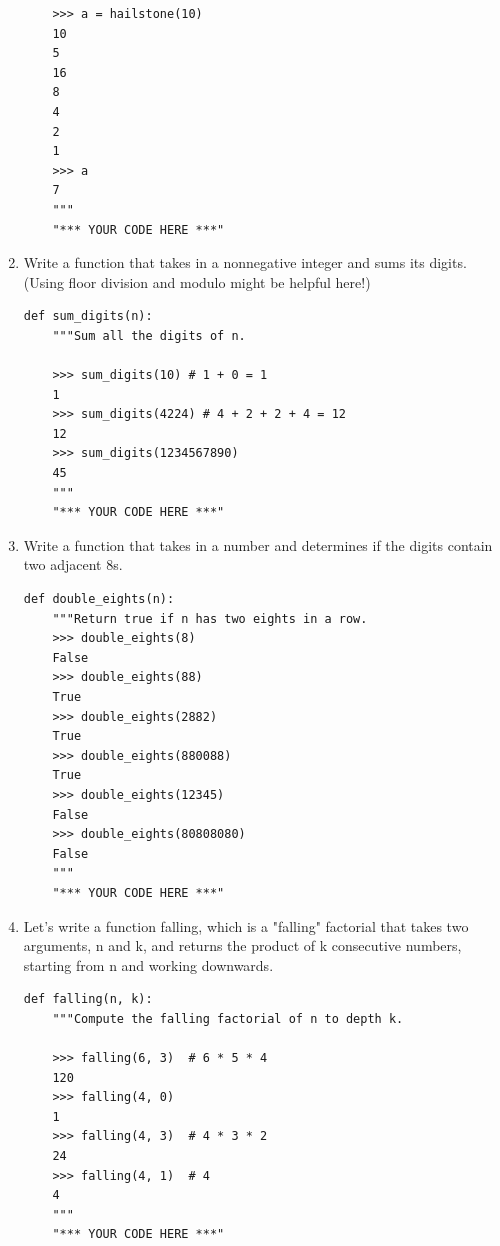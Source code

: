 \documentclass[11pt]{article}
\begin{document}
\begin{enumerate}
\begin{lstlisting}
    >>> a = hailstone(10)
    10
    5
    16
    8
    4
    2
    1
    >>> a
    7
    """
    "*** YOUR CODE HERE ***" 
\end{lstlisting}
\item Write a function that takes in a nonnegative integer and sums its digits. (Using floor division and modulo might be helpful here!)
\begin{lstlisting}
def sum_digits(n):
    """Sum all the digits of n.

    >>> sum_digits(10) # 1 + 0 = 1
    1
    >>> sum_digits(4224) # 4 + 2 + 2 + 4 = 12
    12
    >>> sum_digits(1234567890)
    45
    """
    "*** YOUR CODE HERE ***"
\end{lstlisting}
\item Write a function that takes in a number and determines if the digits contain two adjacent 8s.
\begin{lstlisting}
def double_eights(n):
    """Return true if n has two eights in a row.
    >>> double_eights(8)
    False
    >>> double_eights(88)
    True
    >>> double_eights(2882)
    True
    >>> double_eights(880088)
    True
    >>> double_eights(12345)
    False
    >>> double_eights(80808080)
    False
    """
    "*** YOUR CODE HERE ***"
\end{lstlisting}
\item Let's write a function falling, which is a "falling" factorial that takes two arguments, n and k, and returns the product of k consecutive numbers, starting from n and working downwards.
\begin{lstlisting}
def falling(n, k):
    """Compute the falling factorial of n to depth k.

    >>> falling(6, 3)  # 6 * 5 * 4
    120
    >>> falling(4, 0)
    1
    >>> falling(4, 3)  # 4 * 3 * 2
    24
    >>> falling(4, 1)  # 4
    4
    """
    "*** YOUR CODE HERE ***"
\end{lstlisting}
\end{enumerate}
\end{document}
